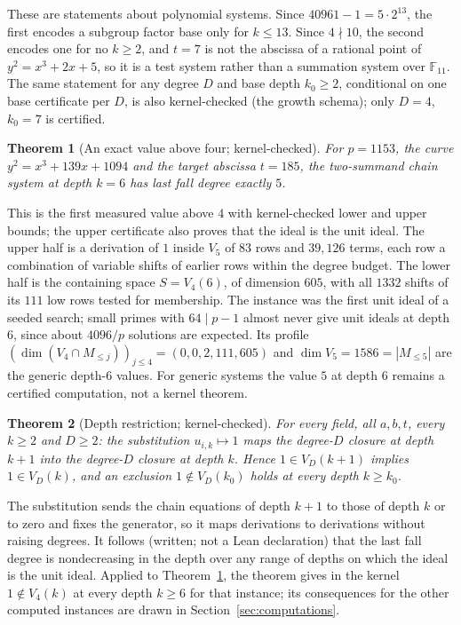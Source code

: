 \documentclass[11pt]{article}
\newtheorem{theorem}{Theorem}
\theoremstyle{definition}\newtheorem{definition}[theorem]{Definition}
\theoremstyle{remark}\newtheorem{remark}[theorem]{Remark}
\newcommand{\F}{\mathbb F}
\begin{document}
These are statements about polynomial systems. Since
$40961-1=5\cdot2^{13}$, the first encodes a subgroup factor base only for
$k\le13$. Since $4\nmid10$, the second encodes one for no $k\ge2$, and
$t=7$ is not the abscissa of a rational point of $y^2=x^3+2x+5$, so it is a
test system rather than a summation system over $\F_{11}$. The same
statement for any degree $D$ and base depth $k_0\ge2$, conditional on one
base certificate per $D$, is also kernel-checked (the growth schema); only
$D=4$, $k_0=7$ is certified.

\begin{theorem}[An exact value above four; kernel-checked]\label{thm:exactsix}
For $p=1153$, the curve $y^2=x^3+139x+1094$ and the target abscissa
$t=185$, the two-summand chain system at depth $k=6$ has last fall degree
exactly $5$.
\end{theorem}

This is the first measured value above $4$ with kernel-checked lower and
upper bounds; the upper certificate also proves that the ideal is the unit
ideal. The upper half is a derivation of $1$ inside $V_5$ of $83$ rows and
$39{,}126$ terms, each row a combination of variable shifts of earlier rows
within the degree budget. The lower half is the containing space
$S=V_4(6)$, of dimension $605$, with all $1332$ shifts of its $111$ low rows
tested for membership. The instance was the first unit ideal of a seeded
search; small primes with $64\mid p-1$ almost never give unit ideals at
depth $6$, since about $4096/p$ solutions are expected. Its profile
$(\dim(V_4\cap M_{\le j}))_{j\le4}=(0,0,2,111,605)$ and
$\dim V_5=1586=|M_{\le5}|$ are the generic depth-$6$ values. For generic
systems the value $5$ at depth $6$ remains a certified computation, not a
kernel theorem.

\begin{theorem}[Depth restriction; kernel-checked]\label{thm:restrict}
For every field, all $a,b,t$, every $k\ge2$ and $D\ge2$: the substitution
$u_{i,k}\mapsto1$ maps the degree-$D$ closure at depth $k+1$ into the
degree-$D$ closure at depth $k$. Hence $1\in V_D(k+1)$ implies
$1\in V_D(k)$, and an exclusion $1\notin V_D(k_0)$ holds at every depth
$k\ge k_0$.
\end{theorem}
The substitution sends the chain equations of depth $k+1$ to those of depth
$k$ or to zero and fixes the generator, so it maps derivations to
derivations without raising degrees. It follows (written; not a Lean
declaration) that the last fall degree is nondecreasing in the depth over
any range of depths on which the ideal is the unit ideal. Applied to
Theorem~\ref{thm:exactsix}, the theorem gives in the kernel
$1\notin V_4(k)$ at every depth $k\ge6$ for that instance; its consequences
for the other computed instances are drawn in
Section~\ref{sec:computations}.
\end{document}
